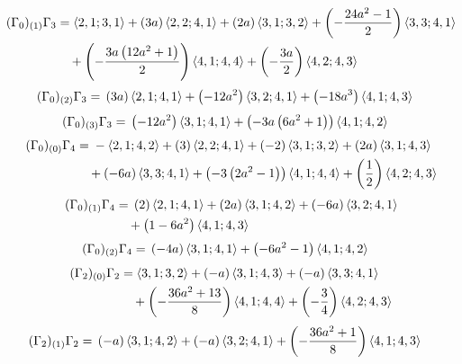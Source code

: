 \begin{align*}
(\Gamma_0)_{(1)}\Gamma_3 &={} \langle 2,1;3,1\rangle + \left(3 a\right)\langle 2,2;4,1\rangle + \left(2 a\right)\langle 3,1;3,2\rangle + \left(- \frac{24 a^{2} - 1}{2}\right)\langle 3,3;4,1\rangle\\
&\quad {}+ \left(- \frac{3 a \left(12 a^{2} + 1\right)}{2}\right)\langle 4,1;4,4\rangle + \left(- \frac{3 a}{2}\right)\langle 4,2;4,3\rangle
\end{align*}
\begin{align*}
(\Gamma_0)_{(2)}\Gamma_3 &={} \left(3 a\right)\langle 2,1;4,1\rangle + \left(- 12 a^{2}\right)\langle 3,2;4,1\rangle + \left(- 18 a^{3}\right)\langle 4,1;4,3\rangle
\end{align*}
\begin{align*}
(\Gamma_0)_{(3)}\Gamma_3 &={} \left(- 12 a^{2}\right)\langle 3,1;4,1\rangle + \left(- 3 a \left(6 a^{2} + 1\right)\right)\langle 4,1;4,2\rangle
\end{align*}
\begin{align*}
(\Gamma_0)_{(0)}\Gamma_4 &={} -\langle 2,1;4,2\rangle + \left(3\right)\langle 2,2;4,1\rangle + \left(-2\right)\langle 3,1;3,2\rangle + \left(2 a\right)\langle 3,1;4,3\rangle\\
&\quad {}+ \left(- 6 a\right)\langle 3,3;4,1\rangle + \left(- 3 \left(2 a^{2} - 1\right)\right)\langle 4,1;4,4\rangle + \left(\frac{1}{2}\right)\langle 4,2;4,3\rangle
\end{align*}
\begin{align*}
(\Gamma_0)_{(1)}\Gamma_4 &={} \left(2\right)\langle 2,1;4,1\rangle + \left(2 a\right)\langle 3,1;4,2\rangle + \left(- 6 a\right)\langle 3,2;4,1\rangle\\
&\quad {}+ \left(1 - 6 a^{2}\right)\langle 4,1;4,3\rangle
\end{align*}
\begin{align*}
(\Gamma_0)_{(2)}\Gamma_4 &={} \left(- 4 a\right)\langle 3,1;4,1\rangle + \left(- 6 a^{2} - 1\right)\langle 4,1;4,2\rangle
\end{align*}
\begin{align*}
(\Gamma_2)_{(0)}\Gamma_2 &={} \langle 3,1;3,2\rangle + \left(- a\right)\langle 3,1;4,3\rangle + \left(- a\right)\langle 3,3;4,1\rangle\\
&\quad {}+ \left(- \frac{36 a^{2} + 13}{8}\right)\langle 4,1;4,4\rangle + \left(- \frac{3}{4}\right)\langle 4,2;4,3\rangle
\end{align*}
\begin{align*}
(\Gamma_2)_{(1)}\Gamma_2 &={} \left(- a\right)\langle 3,1;4,2\rangle + \left(- a\right)\langle 3,2;4,1\rangle + \left(- \frac{36 a^{2} + 1}{8}\right)\langle 4,1;4,3\rangle
\end{align*}
